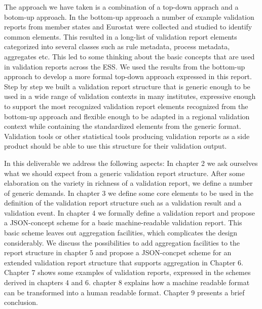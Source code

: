 The approach we have taken is a combination of a top-down apprach and a botom-up approach.
In the bottom-up approach a number of example validation reports from member states and Eurostat were collected and studied to identify common elements.
This resulted in a long-list of validation report elements categorized into several classes such as rule metadata, process metadata, aggregates etc.
This led to some thinking about the basic concepts that are used in validation reports across the ESS.
We used the results from the bottom-up approach to develop a more formal top-down approach expressed in this report.
Step by step we built a validation report structure that is generic enough to be used in a wide range of validation contexts in many institutes,
expressive enough to support the most recognized validation report elements recognized from the bottom-up approach and
flexible enough to be adapted in a regional validation context while containing the standardized elements from the generic format.
Validation tools or other statistical tools producing validation reports as a side product should be able to use this structure for their validation output.

In this deliverable we address the following aspects:
In chapter 2 we ask ourselves what we should expect from a generic validation report structure.
After some elaboration on the variety in richness of a validation report, we define a number of generic demands.
In chapter 3 we define some core elements to be used in the definition of the validation report structure such as a validation result and a validation event.
In chapter 4 we formally define a validation report and propose a JSON-concept scheme for a basic machine-readable validation report.
This basic scheme leaves out aggregation facilities, which complicates the design considerably.
We discuss the possibilities to add aggregation facilities to the report structure in chapter 5 and propose a JSON-concpet scheme for an extended validation report structure that supports aggregation in Chapter 6.
Chapter 7 shows some examples of validation reports, expressed in the schemes derived in chapters 4 and 6.
chapter 8 explains how a machine readable format can be transformed into a human readable format.
Chapter 9 presents a brief conclusion.

